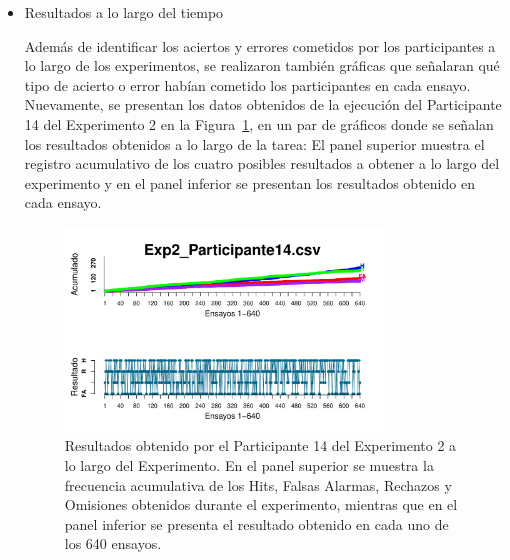 \begin{itemize}


\item Resultados a lo largo del tiempo

Además de identificar los aciertos y errores cometidos por los participantes a lo largo de los experimentos, se realizaron también gráficas que señalaran qué tipo de acierto o error habían cometido los participantes en cada ensayo. Nuevamente, se presentan los datos obtenidos de la ejecución del Participante 14 del Experimento 2 en la Figura~\ref{fig:Outcome_E2_P14}, en un par de gráficos donde se señalan los resultados obtenidos a lo largo de la tarea: El panel superior muestra el registro acumulativo de los cuatro posibles resultados a obtener a lo largo del experimento y en el panel inferior se presentan los resultados obtenido en cada ensayo.\\ 

\begin{figure}[th]
\centering
\includegraphics[width=0.80\textwidth]{Figures/Outcome_Exp2_P14}
\caption[Resultado obtenido a lo largo del tiempo: Ejemplo]{Resultados obtenido por el Participante 14 del Experimento 2 a lo largo del Experimento. En el panel superior se muestra la frecuencia acumulativa de los  Hits, Falsas Alarmas, Rechazos y Omisiones obtenidos durante el experimento, mientras que en el panel inferior se presenta el resultado obtenido en cada uno de los 640 ensayos.}
\label{fig:Outcome_E2_P14}
\end{figure}


\end{itemize}










